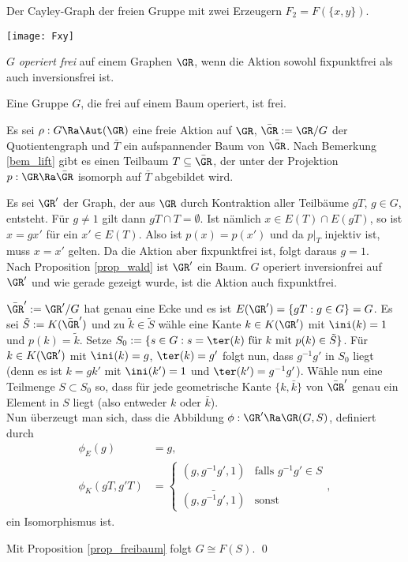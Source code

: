 \BSP Der Cayley-Graph der freien Gruppe mit zwei Erzeugern
$F_2=F(\{x,y\})$.
\begin{center}
	\texttt{[image: Fxy]}
\end{center}

\DEF $G$ \emph{operiert frei}
auf einem Graphen $\GR$, wenn die Aktion sowohl
fixpunktfrei als auch inversionsfrei ist.

\SATZ\label{satz_frei} Eine Gruppe $G$, die frei auf einem Baum
operiert, ist frei.

\bew Es sei $\rho:G\Ra\Aut(\GR)$ eine freie Aktion auf $\GR$,
$\bar{\GR}:=\GR/G$ der Quotientengraph und $\bar{T}$ ein aufspannender
Baum von $\bar{\GR}$. Nach Bemerkung \ref{bem_lift} gibt es einen
Teilbaum $T\subseteq \bar{\GR}$, der unter der Projektion
$p:\GR\Ra\bar{\GR}$ isomorph auf $\bar{T}$ abgebildet wird.

Es sei $\GR'$ der Graph, der aus $\GR$ durch Kontraktion aller
Teilbäume $gT$, $g\in G$, entsteht.
Für $g\neq 1$ gilt dann $gT\cap T=\emptyset$.
Ist nämlich $x\in E(T)\cap E(gT)$, so ist $x=gx'$ für ein
$x'\in E(T)$. Also ist $p(x)=p(x')$ und da $p|_T$ injektiv ist,
muss $x=x'$ gelten. Da die Aktion aber fixpunktfrei ist, folgt
daraus $g=1$.\\
Nach Proposition \ref{prop_wald} ist $\GR'$ ein Baum. $G$ operiert
inversionfrei auf $\GR'$ und wie gerade gezeigt wurde, ist
die Aktion auch fixpunktfrei.

$\bar{\GR}':=\GR'/G$ hat genau eine Ecke und es ist
$E(\GR')=\{gT:g \in G\}=G$.
Es sei $\tilde{S}:= K(\bar{\GR}')$ und zu $\tilde{k}\in\tilde{S}$
wähle eine Kante $k\in K(\GR')$ mit $\ini(k)=1$ und $p(k)=\tilde{k}$.
Setze
$S_0:=\{s\in G: s=\ter(k)\text{ für $k$ mit $p(k)\in\tilde{S}$}\}$.
Für $k\in K(\GR')$ mit $\ini(k)=g$, $\ter(k)=g'$ folgt nun,
dass $g^{-1}g'$ in $S_0$ liegt (denn es ist $k=gk'$ mit
$\ini(k')=1$ und $\ter(k')=g^{-1}g'$).
Wähle nun eine Teilmenge $S\subset S_0$ so, dass für jede
geometrische Kante $\{k,\bar{k}\}$ von $\bar{\GR}'$ genau
ein Element in $S$ liegt (also entweder $k$ oder $\bar{k}$).\\
Nun überzeugt man sich, dass die Abbildung
$\phi:\GR'\Ra\GR(G,S)$, definiert durch
\begin{align*}
\phi_E(g) &= g,\\
\phi_K(gT,g'T) &=
\left\{
\begin{matrix}
(g,g^{-1}g',1) & \text{falls } g^{-1}g'\in S \\
\\
\bar{(g,g^{-1}g',1)} & \text{sonst}
\end{matrix}\right.,
\end{align*}
ein Isomorphismus ist.

Mit Proposition \ref{prop_freibaum} folgt $G\cong F(S)$.
\qed
